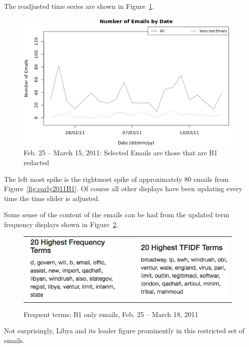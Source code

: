 \documentclass[journal]{vgtc}                %
\begin{document}
The readjusted time series are shown in Figure~\ref{fig:EmailVolumeB1LibyaBuildup}.
\begin{figure}[h]
\begin{center}
\includegraphics[width=0.95\linewidth]{EmailVolumeB1LibyaBuildup}
\caption{Feb. 25 -- March 15, 2011:  Selected Emails are those that are B1 redacted}
\label{fig:EmailVolumeB1LibyaBuildup}
\end{center}
\end{figure}
The left most spike is the rightmost spike of approximately 80 emails from Figure~\ref{fig:early2011B1}.   
Of course all other displays have been updating every time the time slider is adjusted.  

Some sense of the content of the emails can be had from the updated term frequency displays shown in Figure~\ref{fig:TermFreqB1LibyaBuildup}.
\begin{figure}[h]
\begin{center}
\begin{tabular}{ccc}
\includegraphics[width=0.4\linewidth]{TFIDFB1LibyaBuildup} &
$~~~~$ &
\includegraphics[width=0.4\linewidth]{TermFreqB1LibyaBuildup} 
\end{tabular}
\caption{Frequent terms: B1 only emails, Feb. 25 -- March 18, 2011}
\label{fig:TermFreqB1LibyaBuildup}
\end{center}
\end{figure}
Not surprisingly,  Libya and its leader figure prominently in this restricted set of emails.  
\end{document}
